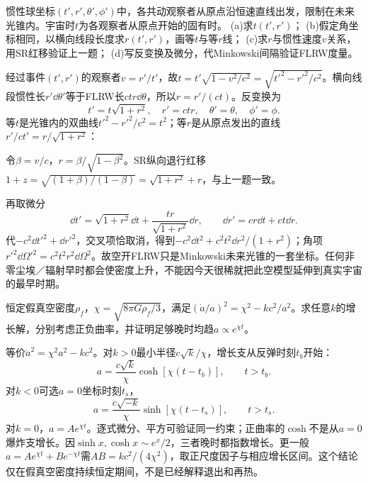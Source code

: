 \begin{exercise}
惯性球坐标$(t',r',\theta',\phi')$中，各共动观察者从原点沿恒速直线出发，限制在未来光锥内。宇宙时$t$为各观察者从原点开始的固有时。
(a)求$t(t',r')$；
(b)假定角坐标相同，以横向线段长度求$r(t',r')$，画等$t$与等$r$线；
(c)求$r$与惯性速度$v$关系，用SR红移验证上一题；
(d)写反变换及微分，代Minkowski间隔验证FLRW度量。
\end{exercise}
\begin{solution}
经过事件$(t',r')$的观察者$v=r'/t'$，故$t=t'\sqrt{1-v^2/c^2}=\sqrt{t'^2-r'^2/c^2}$。横向线段惯性长$r'\dd\theta'$等于FLRW长$ctr\dd\theta$，所以$r=r'/(ct)$。反变换为
\[
 t'=t\sqrt{1+r^2},\quad r'=ctr,\quad\theta'=\theta,\quad\phi'=\phi .
\]
等$t$是光锥内的双曲线$t'^2-r'^2/c^2=t^2$；等$r$是从原点发出的直线$r'/ct'=r/\sqrt{1+r^2}$：
\begin{center}\end{center}
令$\beta=v/c$，$r=\beta/\sqrt{1-\beta^2}$。SR纵向退行红移$1+z=\sqrt{(1+\beta)/(1-\beta)}=\sqrt{1+r^2}+r$，与上一题一致。

再取微分
\[
 \dd t'=\sqrt{1+r^2}\dd t+\frac{tr}{\sqrt{1+r^2}}\dd r,\qquad
 \dd r'=cr\dd t+ct\dd r.
\]
代$-c^2\dd t'^2+\dd r'^2$，交叉项恰取消，得到$-c^2\dd t^2+c^2t^2\dd r^2/(1+r^2)$；角项$r'^2\dd\Omega'^2=c^2t^2r^2\dd\Omega^2$。故空开FLRW只是Minkowski未来光锥的一套坐标。任何非零尘埃／辐射早时都会使密度上升，不能因今天很稀就把此空模型延伸到真实宇宙的最早时期。
\end{solution}

\begin{exercise}
恒定假真空密度$\rho_f$，$\chi=\sqrt{8\pi G\rho_f/3}$，满足$(\dot a/a)^2=\chi^2-kc^2/a^2$。求任意$k$的增长解，分别考虑正负曲率，并证明足够晚时均趋$a\propto e^{\chi t}$。
\end{exercise}
\begin{solution}
等价$\dot a^2=\chi^2a^2-kc^2$。对$k>0$最小半径$c\sqrt{k}/\chi$，增长支从反弹时刻$t_b$开始：
\[
 a=\frac{c\sqrt{k}}{\chi}\cosh[\chi(t-t_b)],\qquad t>t_b .
\]
对$k<0$可选$a=0$坐标时刻$t_s$，
\[
 a=\frac{c\sqrt{-k}}{\chi}\sinh[\chi(t-t_s)],\qquad t>t_s .
\]
对$k=0$，$a=Ae^{\chi t}$。逐式微分、平方可验证同一约束；正曲率的$\cosh$不是从$a=0$爆炸支增长。因$\sinh x,\cosh x\sim e^x/2$，三者晚时都指数增长。更一般$a=Ae^{\chi t}+Be^{-\chi t}$需$AB=kc^2/(4\chi^2)$，取正尺度因子与相应增长区间。这个结论仅在假真空密度持续恒定期间，不是已经解释退出和再热。
\end{solution}

